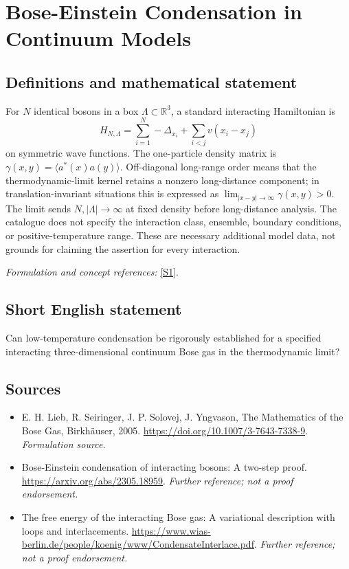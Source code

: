 \documentclass[11pt]{article}
\begin{document}
\section*{\texorpdfstring{Bose-Einstein Condensation in Continuum Models}{Bose-Einstein Condensation in Continuum Models}}\label{7800013}
\subsection{Definitions and mathematical statement}
For $N$ identical bosons in a box $\Lambda\subset{\mathbb{R}}^3$, a standard interacting Hamiltonian is
\[
 H_{N,\Lambda}=\sum_{i=1}^N-\Delta_{x_i}+\sum_{i<j}v(x_i-x_j)
\]
on symmetric wave functions. The one-particle density matrix is $\gamma(x,y)=\langle a^*(x)a(y)\rangle$. Off-diagonal long-range order means that the thermodynamic-limit kernel retains a nonzero long-distance component; in translation-invariant situations this is expressed as $\lim_{|x-y|\to\infty}\gamma(x,y)>0$. The limit sends $N,|\Lambda|\to\infty$ at fixed density before long-distance analysis. The catalogue does not specify the interaction class, ensemble, boundary conditions, or positive-temperature range. These are necessary additional model data, not grounds for claiming the assertion for every interaction.
\par\smallskip\textit{Formulation and concept references:} \href{https://doi.org/10.1007/3-7643-7338-9}{[S1]}.

\subsection{Short English statement}
Can low-temperature condensation be rigorously established for a specified interacting three-dimensional continuum Bose gas in the thermodynamic limit?
\subsection{Sources}
\begin{itemize}
\item[S1]E. H. Lieb, R. Seiringer, J. P. Solovej, J. Yngvason, The Mathematics of the Bose Gas, Birkhäuser, 2005.
\url{https://doi.org/10.1007/3-7643-7338-9}.
\textit{Formulation source.}
\item[S2]Bose-Einstein condensation of interacting bosons: A two-step proof.
\url{https://arxiv.org/abs/2305.18959}.
\textit{Further reference; not a proof endorsement.}
\item[S3]The free energy of the interacting Bose gas: A variational description with loops and interlacements.
\url{https://www.wias-berlin.de/people/koenig/www/CondensateInterlace.pdf}.
\textit{Further reference; not a proof endorsement.}
\end{itemize}
\end{document}

